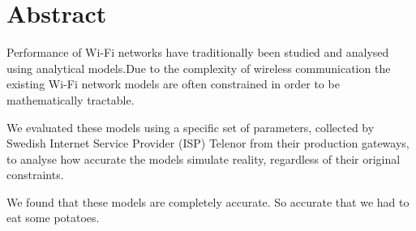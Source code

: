 \chapter*{Abstract}

Performance of Wi-Fi networks have traditionally been studied and analysed using analytical models.Due to the complexity of wireless communication the existing Wi-Fi network models are often constrained in order to be mathematically tractable.

We evaluated these models using a specific set of parameters, collected by Swedish Internet Service Provider (ISP) Telenor from their production gateways, to analyse how accurate the models simulate reality, regardless of their original constraints.\cite{bianchi}

We found that these models are completely accurate. So accurate that we had to eat some potatoes.